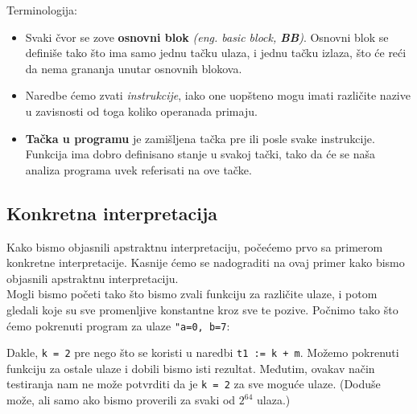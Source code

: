 Terminologija:
\begin{itemize}
\item Svaki čvor se zove \textbf{osnovni blok} \emph{(eng. basic block, \textbf{BB})}. Osnovni blok se definiše tako što ima samo jednu tačku ulaza, i jednu tačku izlaza, što će reći da nema grananja unutar osnovnih blokova.
\item Naredbe ćemo zvati \emph{instrukcije}, iako one uopšteno mogu imati različite nazive u zavisnosti od toga koliko operanada primaju.
\item \textbf{Tačka u programu} je zamišljena tačka pre ili posle svake instrukcije. Funkcija ima dobro definisano stanje u svakoj tački, tako da će se naša analiza programa uvek referisati na ove tačke.
\end{itemize}


\subsection{Konkretna interpretacija}
\label{subsec:concreteimpr}
Kako bismo objasnili apstraktnu interpretaciju, počećemo prvo sa primerom konkretne interpretacije.
Kasnije ćemo se nadograditi na ovaj primer kako bismo objasnili apstraktnu interpretaciju. \\
Mogli bismo početi tako što bismo zvali funkciju za različite ulaze, i potom gledali koje su sve promenljive konstantne
kroz sve te pozive. Počnimo tako što ćemo pokrenuti program za ulaze \texttt{"a=0, b=7}:

Dakle, \texttt{k = 2} pre nego što se koristi u naredbi \texttt{t1 := k + m}. Možemo pokrenuti funkciju za ostale ulaze i dobili bismo isti rezultat.
Međutim, ovakav način testiranja nam ne može potvrditi da je \texttt{k = 2} za sve moguće ulaze. (Doduše može, ali samo ako bismo proverili za svaki od $2^{64}$ ulaza.)


